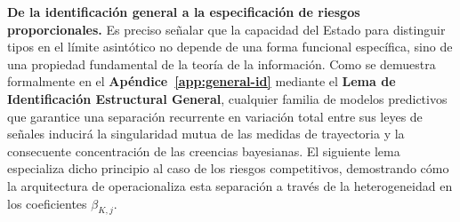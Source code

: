 \documentclass[12pt]{article}
\providecommand{\textcite}{\citet}
\theoremstyle{definition}
\theoremstyle{remark}
\newcommand{\1}{\mathbf{1}}
\begin{document}
\medskip
\noindent\textbf{De la identificación general a la especificación de riesgos proporcionales.} 
Es preciso señalar que la capacidad del Estado para distinguir tipos en el límite asintótico no depende de una forma funcional específica, sino de una propiedad fundamental de la teoría de la información. Como se demuestra formalmente en el \textbf{Apéndice~\ref{app:general-id}} mediante el \textbf{Lema de Identificación Estructural General}, cualquier familia de modelos predictivos que garantice una separación recurrente en variación total entre sus leyes de señales inducirá la singularidad mutua de las medidas de trayectoria y la consecuente concentración de las creencias bayesianas. El siguiente lema especializa dicho principio al caso de los riesgos competitivos, demostrando cómo la arquitectura de \textcite{Cox1972} operacionaliza esta separación a través de la heterogeneidad en los coeficientes $\beta_{K,j}$.
\end{document}
